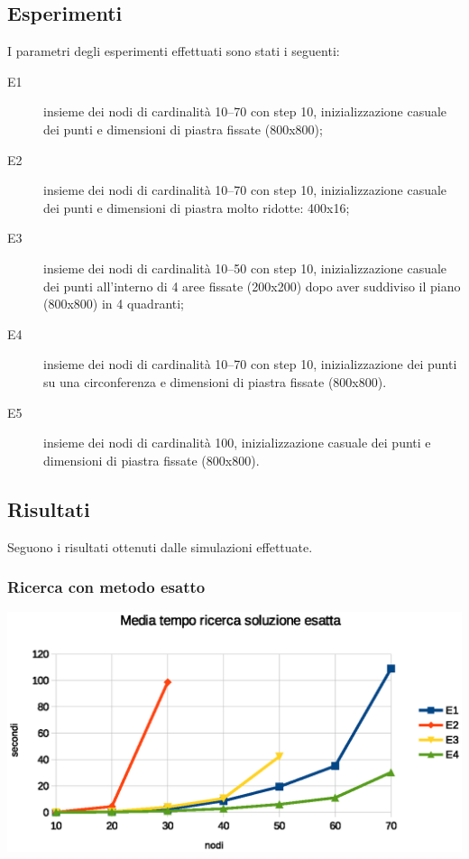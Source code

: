 \documentclass[a4paper]{article}
\begin{document}
        \subsection{Esperimenti}
        I parametri degli esperimenti effettuati sono stati i seguenti:
        \begin{description}
            \item[E1] insieme dei nodi di cardinalit\`a 10--70 con step 10, inizializzazione casuale dei punti e dimensioni di piastra fissate (800x800);
            \item[E2] insieme dei nodi di cardinalit\`a 10--70 con step 10, inizializzazione casuale dei punti e dimensioni di piastra molto ridotte: 400x16;
            \item[E3] insieme dei nodi di cardinalit\`a 10--50 con step 10, inizializzazione casuale dei punti all'interno di 4 aree fissate (200x200) dopo aver suddiviso il piano (800x800) in 4 quadranti;
            \item[E4] insieme dei nodi di cardinalit\`a 10--70 con step 10, inizializzazione dei punti su una circonferenza e dimensioni di piastra fissate (800x800).
            \item[E5] insieme dei nodi di cardinalit\`a 100, inizializzazione casuale dei punti e dimensioni di piastra fissate (800x800).
        \end{description}

        \subsection{Risultati}
            Seguono i risultati ottenuti dalle simulazioni effettuate.
            \subsubsection{Ricerca con metodo esatto}

                \includegraphics[scale=0.7]{img/exavgtime}
\end{document}
